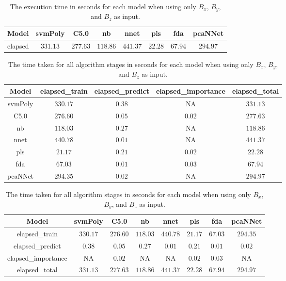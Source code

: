 \begin{table}[!ht]
	\centering
	\begin{tabular}{|c|c|c|c|c|c|c|c|}
		\hline
		Model & svmPoly & C5.0 & nb & nnet & pls & fda & pcaNNet \\ \hline
		elapsed & $331.13$ & $277.63$ & $118.86$ & $441.37$ & $22.28$ & $67.94$ & $294.97$ \\ \hline
	\end{tabular}
	\caption{The execution time in seconds for each model when using only $B_{x}$, $B_{y}$, and $B_{z}$ as input.}
	\label{tab:time:reverse:coord:total}
\end{table}

\begin{table}[!ht]
	\centering
	\begin{tabular}{|c|c|c|c|c|}
		\hline
		Model & elapsed_train & elapsed_predict & elapsed_importance & elapsed_total \\ \hline
		svmPoly & $330.17$ & $0.38$ & NA & $331.13$ \\ \hline
		C5.0 & $276.60$ & $0.05$ & $0.02$ & $277.63$ \\ \hline
		nb & $118.03$ & $0.27$ & NA & $118.86$ \\ \hline
		nnet & $440.78$ & $0.01$ & NA & $441.37$ \\ \hline
		pls & $21.17$ & $0.21$ & $0.02$ & $22.28$ \\ \hline
		fda & $67.03$ & $0.01$ & $0.03$ & $67.94$ \\ \hline
		pcaNNet & $294.35$ & $0.02$ & NA & $294.97$ \\ \hline
	\end{tabular}
	\caption{The time taken for all algorithm stages in seconds for each model when using only $B_{x}$, $B_{y}$, and $B_{z}$ as input.}
	\label{tab:time:coord}
\end{table}

\begin{table}[!ht]
	\centering
	\begin{tabular}{|c|c|c|c|c|c|c|c|}
		\hline
		Model & svmPoly & C5.0 & nb & nnet & pls & fda & pcaNNet \\ \hline
		elapsed_train & $330.17$ & $276.60$ & $118.03$ & $440.78$ & $21.17$ & $67.03$ & $294.35$ \\ \hline
		elapsed_predict & $0.38$ & $0.05$ & $0.27$ & $0.01$ & $0.21$ & $0.01$ & $0.02$ \\ \hline
		elapsed_importance & NA & $0.02$ & NA & NA & $0.02$ & $0.03$ & NA \\ \hline
		elapsed_total & $331.13$ & $277.63$ & $118.86$ & $441.37$ & $22.28$ & $67.94$ & $294.97$ \\ \hline
	\end{tabular}
	\caption{The time taken for all algorithm stages in seconds for each model when using only $B_{x}$, $B_{y}$, and $B_{z}$ as input.}
	\label{tab:time:reverse:coord}
\end{table}

